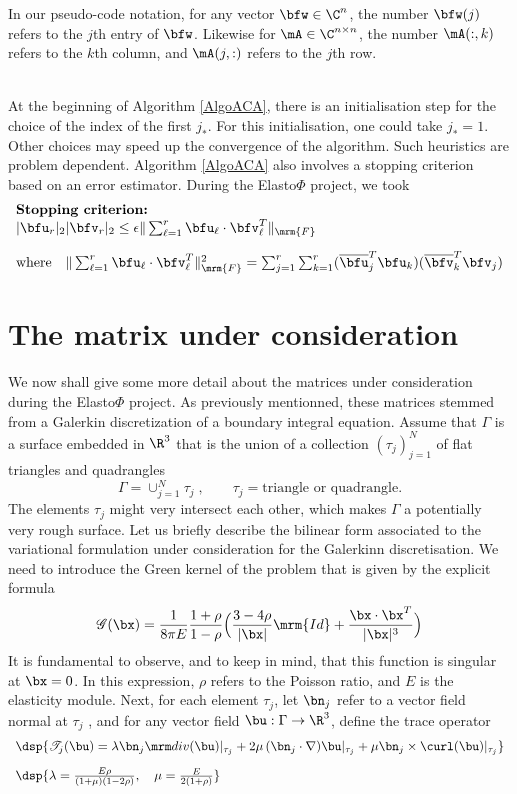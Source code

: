 \noindent 
In our pseudo-code notation, for any vector $\bfw\in \C^{n}$, the number $\bfw(j)$  refers to the $j$th entry of $\bfw$. 
Likewise for $\mA\in \C^{n\times n}$, the number $\mA(:,k)$ refers to the $k$th column, and $\mA(j,:)$ refers to the $j$th
row.

\quad\\
At the beginning of Algorithm \ref{AlgoACA}, there is an initialisation step for the choice of the index of the first $j_{*}$. 
For this initialisation, one could take $j_{*} = 1$. Other choices may speed up the convergence of the algorithm. Such heuristics 
are problem dependent. Algorithm \ref{AlgoACA} also involves a stopping criterion based on an error estimator. During the Elasto$\Phi$ 
project, we took 
$$
\begin{array}{l}
\textbf{Stopping criterion:}\\ 
\vert \bfu_{r}\vert_{2}\vert \bfv_{r}\vert_{2}\leq  \epsilon\Vert \sum_{\ell = 1}^{r}\bfu_{\ell}\cdot\bfv_{\ell}^{T}\Vert_{\mrm{F}}\\[10pt]
\textrm{where}\quad \Vert \sum_{\ell = 1}^{r}\bfu_{\ell}\cdot\bfv_{\ell}^{T}\Vert_{\mrm{F}}^{2} = \sum_{j=1}^{r}\sum_{k=1}^{r}
(\overline{\bfu}_{j}^{T}\bfu_{k})(\overline{\bfv}_{k}^{T}\bfv_{j})
\end{array}
$$

\section{The matrix under consideration}

We now shall give some more detail about the matrices under consideration during the Elasto$\Phi$ project. 
As previously mentionned, these matrices stemmed from a Galerkin discretization of a boundary integral 
equation. Assume that $\Gamma$ is a surface embedded in $\R^{3}$ that is the union of a collection 
$(\tau_{j})_{j=1}^{N}$ of flat triangles and quadrangles
$$
\Gamma = \mathop{\cup}_{j=1}^{N}\tau_{j}\;,\quad\quad \tau_{j} = \textrm{triangle or quadrangle}.
$$
The elements $\tau_{j}$ might very intersect each other, which makes $\Gamma$ a potentially very rough surface.
Let us briefly describe the bilinear form associated to the variational formulation under consideration for 
the Galerkinn discretisation. We need to introduce the Green kernel of the problem that is given by the explicit formula 
$$
\mathscr{G}(\bx) = \frac{1}{8\pi E}\frac{1+\rho}{1-\rho}\Big( \frac{3-4\rho}{\vert \bx\vert}\mrm{Id}  +\frac{\bx\cdot\bx^{T}}{\vert \bx\vert^{3}}\Big)
$$
It is fundamental to observe, and to keep in mind, that this function is singular at $\bx = 0$. In this expression, $\rho$ 
refers to the Poisson ratio, and $E$ is the elasticity module. Next, for each element $\tau_{j}$, let  $\bn_{j}$ refer to a vector field 
normal at $\tau_{j}$ , and for any vector field $\bu:\Gamma\to \R^{3}$, define the trace operator
$$
\begin{array}{l}
\dsp{ \mathscr{T}_{j}(\bu) = \lambda\bn_{j}\div(\bu)\vert_{\tau_{j}}+2\mu\,(\bn_{j}\cdot\nabla)\bu\vert_{\tau_{j}} + \mu\bn_{j}\times\curl(\bu)\vert_{\tau_{j}} }\\[10pt]
\dsp{ \lambda = \frac{E\rho}{(1+\mu)(1-2\rho)},\quad \mu = \frac{E}{2(1+\rho)}}
\end{array}
$$


